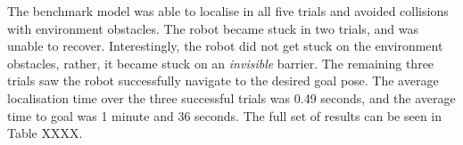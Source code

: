 \documentclass[a4paper]{article}
\begin{document}
\begin{minipage}[t]{0.45\textwidth}
\centering
{}
\end{minipage}
\hspace{1cm}
\begin{minipage}[t]{0.45\textwidth}
\centering
{}
\end{minipage}

\vspace{0.25cm}

\begin{minipage}{0.45\textwidth}
The benchmark model was able to localise in all five trials and avoided collisions with environment obstacles. The robot became stuck in two trials, and was unable to recover. Interestingly, the robot did not get stuck on the environment obstacles, rather, it became stuck on an \textit{invisible} barrier. The remaining three trials saw the robot successfully navigate to the desired goal pose. The average localisation time over the three successful trials was 0.49 seconds, and the average time to goal was 1 minute and 36 seconds. The full set of results can be seen in Table XXXX.
\end{minipage}
\hspace{1cm}
\begin{minipage}{0.45\textwidth}
\centering
{}
\end{minipage}
\end{document}

